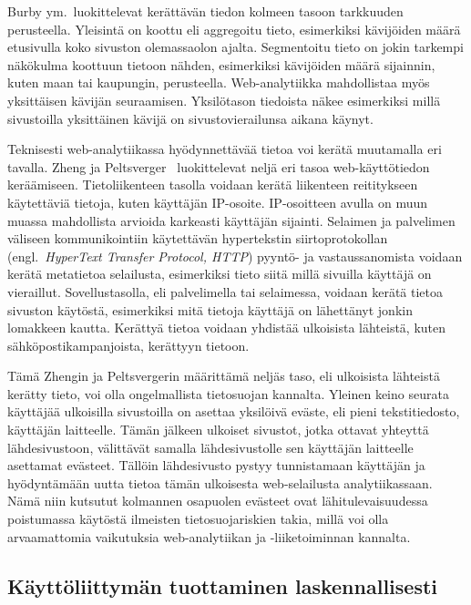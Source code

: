 \documentclass[finnish, 12pt, a4paper, elec, utf8, a-1b, online]{aaltothesis}
\begin{document}
Burby ym.~luokittelevat kerättävän tiedon kolmeen tasoon tarkkuuden perusteella.
Yleisintä on koottu eli aggregoitu tieto, esimerkiksi kävijöiden määrä
etusivulla koko sivuston olemassaolon ajalta. Segmentoitu tieto on jokin
tarkempi näkökulma koottuun tietoon nähden, esimerkiksi kävijöiden määrä
sijainnin, kuten maan tai kaupungin, perusteella. Web-analytiikka mahdollistaa
myös yksittäisen kävijän seuraamisen. Yksilötason tiedoista näkee esimerkiksi
millä sivustoilla yksittäinen kävijä on sivustovierailunsa aikana käynyt.

Teknisesti web-analytiikassa hyödynnettävää tietoa voi kerätä muutamalla eri
tavalla. Zheng ja Peltsverger~\cite{zheng2015web} luokittelevat neljä eri tasoa
web-käyttötiedon keräämiseen. Tietoliikenteen tasolla voidaan kerätä liikenteen
reititykseen käytettäviä tietoja, kuten käyttäjän IP-osoite. IP-osoitteen avulla
on muun muassa mahdollista arvioida karkeasti käyttäjän sijainti. Selaimen ja
palvelimen väliseen kommunikointiin käytettävän hypertekstin siirtoprotokollan
(engl.~\textit{HyperText Transfer Protocol, HTTP}) pyyntö- ja vastaussanomista
voidaan kerätä metatietoa selailusta, esimerkiksi tieto siitä millä sivuilla
käyttäjä on vieraillut. Sovellustasolla, eli palvelimella tai selaimessa,
voidaan kerätä tietoa sivuston käytöstä, esimerkiksi mitä tietoja käyttäjä on
lähettänyt jonkin lomakkeen kautta. Kerättyä tietoa voidaan yhdistää ulkoisista
lähteistä, kuten sähköpostikampanjoista, kerättyyn tietoon.

Tämä Zhengin ja Peltsvergerin määrittämä neljäs taso, eli ulkoisista lähteistä
kerätty tieto, voi olla ongelmallista tietosuojan kannalta. Yleinen keino
seurata käyttäjää ulkoisilla sivustoilla on asettaa yksilöivä eväste, eli pieni
tekstitiedosto, käyttäjän laitteelle. Tämän jälkeen ulkoiset sivustot, jotka
ottavat yhteyttä lähdesivustoon, välittävät samalla lähdesivustolle sen
käyttäjän laitteelle asettamat evästeet. Tällöin lähdesivusto pystyy
tunnistamaan käyttäjän ja hyödyntämään uutta tietoa tämän ulkoisesta
web-selailusta analytiikassaan. Nämä niin kutsutut kolmannen osapuolen evästeet
ovat lähitulevaisuudessa poistumassa käytöstä ilmeisten tietosuojariskien takia,
millä voi olla arvaamattomia vaikutuksia web-analytiikan ja -liiketoiminnan
kannalta.

\subsection{Käyttöliittymän tuottaminen laskennallisesti}
\end{document}

